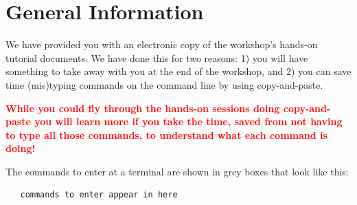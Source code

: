 %
%
\section{General Information}
We have provided you with an electronic copy of the workshop's hands-on tutorial documents.
We have done this for two reasons: 1) you will have something to take away with you at the 
end of the workshop, and 2) you can save time (mis)typing commands on the command line by using
copy-and-paste.

\textcolor{red}{\bf While you could fly through the hands-on sessions doing
copy-and-paste you will learn more if you take the time, saved from not having to type all those
commands, to understand what each command is doing!}

The commands to enter at a terminal are shown in grey boxes that look like this:
\begin{lstlisting}
   commands to enter appear in here
\end{lstlisting}  

